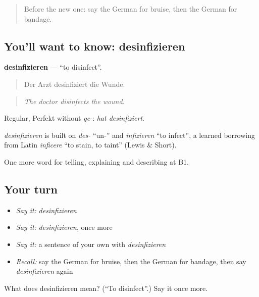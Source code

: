 \begin{quote}
Before the new one: say the German for bruise, then the German for bandage.
\end{quote}

\subsection*{You'll want to know: desinfizieren}
\textbf{desinfizieren} — \textquotedblleft{}to disinfect\textquotedblright{}.

\begin{quote}
Der Arzt desinfiziert die Wunde.
\end{quote}

\begin{quote}
\emph{The doctor disinfects the wound.}
\end{quote}

Regular, Perfekt without \emph{ge-}: \emph{hat desinfiziert}.

\begin{cousinweb}
\emph{desinfizieren} is built on \emph{des-} \textquotedblleft{}un-\textquotedblright{} and \emph{infizieren} \textquotedblleft{}to infect\textquotedblright{}, a learned borrowing from Latin \emph{inficere} \textquotedblleft{}to stain, to taint\textquotedblright{} (Lewis \& Short).
\end{cousinweb}

\begin{grammarlens}[title={What you've built}]
One more word for telling, explaining and describing at B1.
\end{grammarlens}

\subsection*{Your turn}
\begin{itemize}
\raggedright
  \item \emph{Say it:} \emph{desinfizieren}
  \item \emph{Say it:} \emph{desinfizieren}, once more
  \item \emph{Say it:} a sentence of your own with \emph{desinfizieren}
  \item \emph{Recall:} say the German for bruise, then the German for bandage, then say \emph{desinfizieren} again
\end{itemize}

\begin{tcolorbox}[breakable,colback=teal!4,colframe=teal!35!black,title={Before you move on}]
What does desinfizieren mean? (\textquotedblleft{}To disinfect\textquotedblright{}.) Say it once more.
\end{tcolorbox}
